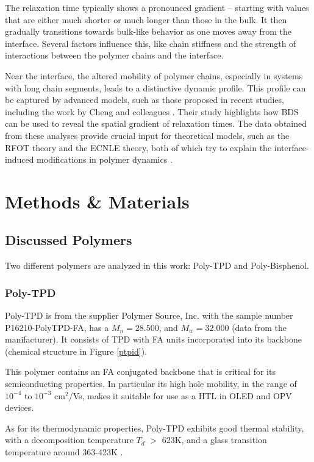 The relaxation time typically shows a pronounced gradient -- starting with values that are either much shorter or much longer than those in the bulk. It then gradually transitions towards bulk-like behavior as one moves away from the interface. Several factors influence this, like chain stiffness and the strength of interactions between the polymer chains and the interface.

Near the interface, the altered mobility of polymer chains, especially in systems with long chain segments, leads to a distinctive dynamic profile. This profile can be captured by advanced models, such as those proposed in recent studies, including the work by Cheng and colleagues \cite{cheng2024}.
Their study highlights how \ac{BDS} can be used to reveal the spatial gradient of relaxation times. The data obtained from these analyses provide crucial input for theoretical models, such as the \ac{RFOT} theory and the \ac{ECNLE} theory, both of which try to explain the interface-induced modifications in polymer dynamics \cite{cheng2024}.


\chapter{Methods \& Materials}
\section{Discussed Polymers}
Two different polymers are analyzed in this work: \ac{Poly-TPD} and \ac{Poly-Bisphenol}.
\subsection{Poly-TPD}
Poly-TPD is from the supplier Polymer Source, Inc.{\texttrademark}  with the sample number P16210-PolyTPD-FA, has a $M_n = 28.500$, and $M_w = 32.000$ (data from the manifacturer). It consists of \ac{TPD} with \ac{FA} units incorporated into its backbone (chemical structure in Figure \ref{ptpid}).

This polymer contains an FA conjugated backbone that is critical for its semiconducting properties. In particular its high hole mobility, in the range of $10^{-4}$ to $10^{-3}$ cm$^2$/Vs, makes it suitable for use as a \ac{HTL} in \ac{OLED} and \ac{OPV} devices.

As for its thermodynamic properties, Poly-TPD exhibits good thermal stability, with a decomposition temperature $T_d$ $>$ 623K, and a glass transition temperature around 363-423K \cite{KIM2017167}.


